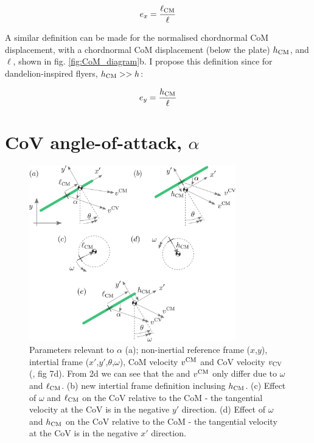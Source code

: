 \documentclass{jfm} %
\begin{document}
\begin{equation} e_{x}  = \frac{\ell_{\textup{CM}}}{\ell} \label{eq:ex} \end{equation}

A similar definition can be made for the normalised chordnormal CoM displacement, with a chordnormal CoM displacement (below the plate) $h_{\textup{CM}}$, and $\ell$, shown in fig. \ref{fig:CoM_diagram}b. I propose this definition since for dandelion-inspired flyers, $h_{\textup{CM}}>>h$:

\begin{equation} e_{y}  = \frac{h_{\textup{CM}}}{\ell} \label{eq:ey} \end{equation}

\section{CoV angle-of-attack, $\alpha$} \label{sec:alpha}

\begin{figure}
    \centering
    \includegraphics[width=0.8\textwidth]{pics/alpha_diagram.png}
    \caption{Parameters relevant to $\alpha$ (a); non-inertial reference frame ($x$,$y$), intertial frame ($x'$,$y'$,$\theta$,$\omega$), CoM velocity $v^{\textup{CM}}$ and CoV velocity $v_{\textup{CV}}$ (\cite{Li2022model}, fig 7d). From
    2d we can see that the and $v^{\textup{CM}}$ only differ due to $\omega$ and $\ell_{\textup{CM}}$. (b) new intertial frame definition inclusing $h_{\textup{CM}}$. (c) Effect of $\omega$ and $\ell_{\textup{CM}}$ on the CoV relative to the CoM - the tangential velocity at the CoV is in the negative $y'$ direction. (d) Effect of $\omega$ and $h_{\textup{CM}}$ on the CoV relative to the CoM - the tangential velocity at the CoV is in the negative $x'$ direction.}
    \label{fig:alpha_diagram}
\end{figure}
\end{document}
